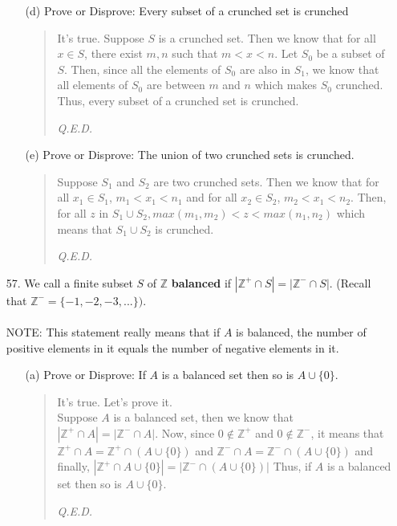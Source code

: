 \documentclass[12pt, a4paper]{article}                      %
\begin{document}
\begin{itemize}
\begin{itemize}
\item[]

\item[(d)]
Prove or Disprove: Every subset of a crunched set is crunched
\begin{quote}
It's true. Suppose $S$ is a crunched set. Then we know that for all $x \in S$, there exist $m, n$ such that $m < x < n$. Let $S_0$ be a subset of $S$. Then, since all the elements of $S_0$ are also in $S_1$, we know that all elements of $S_0$ are between $m$ and $n$ which makes $S_0$ crunched. Thus, every subset of a crunched set is crunched.
\begin{flushright}
\textit{Q.E.D.}
\end{flushright}
\end{quote}

\item[]

\item[(e)]
Prove or Disprove: The union of two crunched sets is crunched.
\begin{quote}
Suppose $S_1$ and $S_2$ are two crunched sets.
Then we know that for all $x_1 \in S_1$, $m_1 < x_1 < n_1$ and for all $x_2 \in S_2$, $m_2 < x_1 < n_2$. Then, for all $z$ in $S_1 \cup S_2, max(m_1, m_2) < z < max(n_1, n_2)$ which means that $S_1 \cup S_2$ is crunched.
\begin{flushright}
\textit{Q.E.D.}
\end{flushright}
\end{quote}
\end{itemize}

\item[]
\item[]

\item[57.]
We call a finite subset $S$ of $\mathbb{Z}$ \textbf{balanced} if
$|\mathbb{Z}^+ \cap S| = |\mathbb{Z}^- \cap S|.$ (Recall that $\mathbb{Z}^- = \{-1, -2, -3, ...\})$.
\\\\
NOTE: This statement really means that if $A$ is balanced, the number of positive elements in it equals
the number of negative elements in it.
\begin{itemize}
\item[]
\item[(a)]
Prove or Disprove: If $A$ is a balanced set then so is $A \cup \{0\}$.
\begin{quote}
It's true. Let's prove it.\\
Suppose $A$ is a balanced set, then we know that $|\mathbb{Z}^+ \cap A| = |\mathbb{Z}^- \cap A|$.
Now, since $0 \notin \mathbb{Z}^+$ and $0 \notin \mathbb{Z}^-$, it means that
$\mathbb{Z}^+ \cap A = \mathbb{Z}^+ \cap (A \cup \{0\})$ and
$\mathbb{Z}^- \cap A = \mathbb{Z}^- \cap (A \cup \{0\})$
and finally, $|\mathbb{Z}^+ \cap A \cup \{0\}| = |\mathbb{Z}^- \cap (A \cup \{0\})|$
Thus, if $A$ is a balanced set then so is $A \cup \{0\}$.
\begin{flushright}
\textit{Q.E.D.}
\end{flushright}
\end{quote}


\end{itemize}
\end{itemize}
\end{document}
